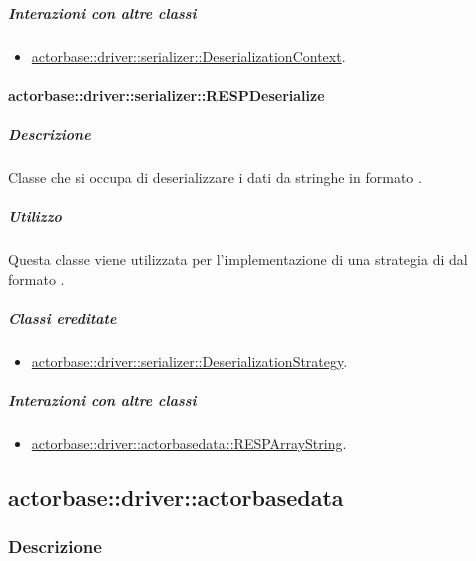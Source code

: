 \documentclass{scalatekids-article}
\begin{document}
\subparagraph{Interazioni con altre classi}

\begin{itemize}

\item \hyperref[sec:actorbase::driver::serializer::DeserializationContext]{actorbase::driver::serializer::DeserializationContext}.

\end{itemize}

\paragraph{actorbase::driver::serializer::RESPDeserialize}

\subparagraph{Descrizione}

Classe che si occupa di deserializzare i dati da stringhe in formato .

\subparagraph{Utilizzo}

Questa classe viene utilizzata per l'implementazione di una strategia di
 dal formato .

\subparagraph{Classi ereditate}

\begin{itemize}

\item \hyperref[sec:actorbase::driver::serializer::DeserializationStrategy]{actorbase::driver::serializer::DeserializationStrategy}.

\end{itemize}

\subparagraph{Interazioni con altre classi}

\begin{itemize}

\item \hyperref[sec:actorbase::driver::actorbasedata::RESPArrayString]{actorbase::driver::actorbasedata::RESPArrayString}.

\end{itemize}

\subsection{actorbase::driver::actorbasedata}
\label{sec:actorbase::driver::actorbasedata}

\subsubsection{Descrizione}
\end{document}

